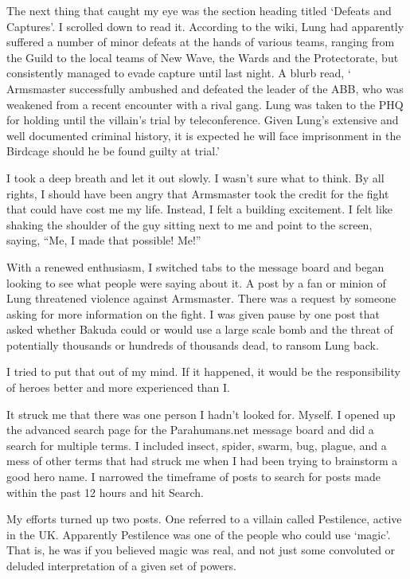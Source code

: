 The next thing that caught my eye was the section heading titled `Defeats and Captures'.  I scrolled down to read it.  According to the wiki, Lung had apparently suffered a number of minor defeats at the hands of various teams, ranging from the Guild to the local teams of New Wave, the Wards and the Protectorate, but consistently managed to evade capture until last night.  A blurb read, ` Armsmaster successfully ambushed and defeated the leader of the ABB, who was weakened from a recent encounter with a rival gang.  Lung was taken to the PHQ for holding until the villain's trial by teleconference.  Given Lung's extensive and well documented criminal history, it is expected he will face imprisonment in the Birdcage should he be found guilty at trial.'



I took a deep breath and let it out slowly.  I wasn't sure what to think.  By all rights, I should have been angry that Armsmaster took the credit for the fight that could have cost me my life.  Instead, I felt a building excitement.  I felt like shaking the shoulder of the guy sitting next to me and point to the screen, saying, ``Me, I made that possible!  Me!''



With a renewed enthusiasm, I switched tabs to the message board and began looking to see what people were saying about it.  A post by a fan or minion of Lung threatened violence against Armsmaster.  There was a request by someone asking for more information on the fight.  I was given pause by one post that asked whether Bakuda could or would use a large scale bomb and the threat of potentially thousands or hundreds of thousands dead, to ransom Lung back.



I tried to put that out of my mind.  If it happened, it would be the responsibility of heroes better and more experienced than I.



It struck me that there was one person I hadn't looked for.  Myself.  I opened up the advanced search page for the Parahumans.net message board and did a search for multiple terms.  I included insect, spider, swarm, bug, plague, and a mess of other terms that had struck me when I had been trying to brainstorm a good hero name.  I narrowed the timeframe of posts to search for posts made within the past 12 hours and hit Search.



My efforts turned up two posts.  One referred to a villain called Pestilence, active in the UK.  Apparently Pestilence was one of the people who could use `magic'.  That is, he was if you believed magic was real, and not just some convoluted or deluded interpretation of a given set of powers.



